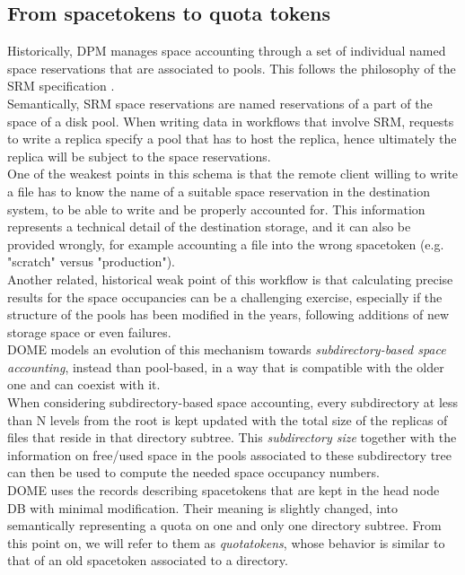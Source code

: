 \documentclass[a4paper]{jpconf}
\begin{document}
\subsection{From spacetokens to quota tokens}
Historically, DPM manages space accounting through a set of individual named space reservations that are associated to pools. This follows the
philosophy of the SRM specification \cite{srm}.\\
Semantically, SRM space reservations are named reservations of a part of the space of a disk pool. When  writing data
in workflows that involve SRM, requests to write a replica specify a pool
that has to host the replica, hence ultimately the replica will be subject to the space reservations.\\

One of the weakest points in this schema is that the remote client willing to write a file
has to know the name of a suitable space reservation in the destination system, to be able to write
and be properly accounted for. This information represents a technical detail
of the destination storage, and it can also  be provided wrongly, for example accounting
a file into the wrong spacetoken (e.g. "scratch" versus "production").\\

Another related, historical weak point of this workflow is that calculating precise results for the space occupancies can be a challenging exercise,
especially if the structure of the pools has been modified in the years, following additions of new storage space or
even failures.\\
DOME models an evolution of this mechanism towards \textit{subdirectory-based space accounting}, instead than pool-based, in a way
that is compatible with the older one and can coexist with it.\\

When considering subdirectory-based space accounting, every subdirectory at less than N levels from the root is kept
updated with the total size of the replicas of files that reside in that directory subtree.
This \textit{subdirectory size} together with the information on free/used space in the pools associated to these subdirectory tree
can then be used to compute the needed space occupancy numbers.\\

DOME uses the records describing spacetokens that are kept in the head node DB with minimal modification. Their meaning is slightly changed,
into semantically representing a quota on one and only one directory subtree. From this point on, we will refer to them as \textit{quotatokens},
whose behavior is similar to that of an old spacetoken associated to a directory.\\
\end{document}
